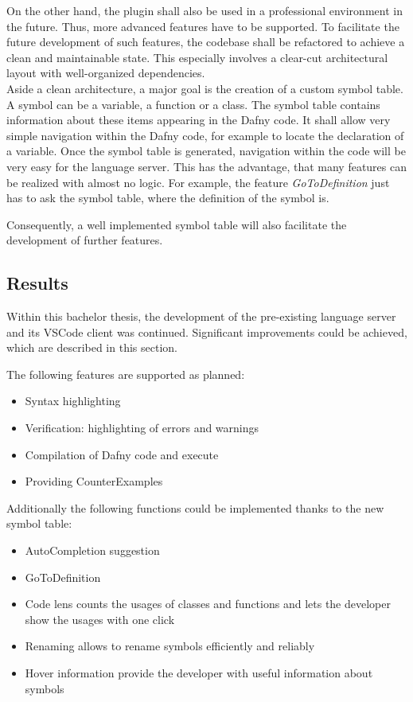 On the other hand, the plugin shall also be used in a professional environment in the future.
Thus, more advanced features have to be supported.
To facilitate the future development of such features, the codebase shall be refactored to achieve a clean and maintainable state.
This especially involves a clear-cut architectural layout with well-organized dependencies.\\

Aside a clean architecture, a major goal is the creation of a custom symbol table.
A symbol can be a variable, a function or a class.
The symbol table contains information about these items appearing in the Dafny code.
It shall allow very simple navigation within the Dafny code, for example to locate the declaration of a variable.
Once the symbol table is generated, navigation within the code will be very easy for the language server.
This has the advantage, that many features can be realized with almost no logic.
For example, the feature \textit{GoToDefinition} just has to ask the symbol table, where the definition of the symbol is.

Consequently, a well implemented symbol table will also facilitate the development of further features.

\subsection{Results}
Within this bachelor thesis, the development of the pre-existing language server and its VSCode client was continued.
Significant improvements could be achieved, which are described in this section.

The following features are supported as planned:
\begin{itemize}
    \item Syntax highlighting
    \item Verification: highlighting of errors and warnings
    \item Compilation of Dafny code and execute
    \item Providing CounterExamples
\end{itemize}

Additionally the following functions could be implemented thanks to the new symbol table:
\begin{itemize}
    \item AutoCompletion suggestion
    \item GoToDefinition
    \item Code lens counts the usages of classes and functions and lets the developer show the usages with one click
    \item Renaming allows to rename symbols efficiently and reliably
    \item Hover information provide the developer with useful information about symbols
\end{itemize}

